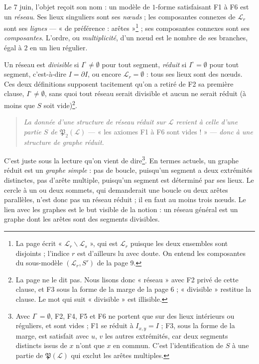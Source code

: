 \documentclass[11pt,a4paper]{article}
\begin{document}
Le 7 juin, l'objet reçoit son nom : un modèle de $1$-forme satisfaisant F1 à
F6 est un \emph{réseau}. Ses lieux singuliers sont ses \emph{nœuds} ; les
composantes connexes de $\mathcal{L}_{r}$ sont ses \emph{lignes} --- « de
préférence : arêtes »\footnote{La page écrit « $\mathcal{L}_{r} \smallsetminus
\mathcal{L}_{s}$ », qui est $\mathcal{L}_{r}$ puisque les deux ensembles sont
disjoints ; l'indice $r$ est d'ailleurs lu avec doute. On entend les
composantes du sous-modèle $(\mathcal{L}_{r}, S')$ de la page 9.} ; ses
composantes connexes sont ses \emph{composantes}. L'ordre, ou
\emph{multiplicité}, d'un nœud est le nombre de ses branches, égal à $2$ en
un lieu régulier.

Un réseau est \emph{divisible} si $I^{\circ} \neq \emptyset$ pour tout
segment, \emph{réduit} si $I^{\circ} = \emptyset$ pour tout segment,
c'est-à-dire $I = \partial I$, ou encore $\mathcal{L}_{r} = \emptyset$ : tous
ses lieux sont des nœuds. Ces deux définitions supposent tacitement qu'on a
retiré de F2 sa première clause, $I^{\circ} \neq \emptyset$, sans quoi tout
réseau serait divisible et aucun ne serait réduit (à moins que $S$ soit
vide)\footnote{La page ne le dit pas. Nous lisons donc « réseau » avec F2
privé de cette clause, et F3 sous la forme de la marge de la page 6 ;
« divisible » restitue la clause. Le mot qui suit « divisible » est
illisible.}.

\begin{quote}
\emph{La donnée d'une structure de réseau réduit sur $\mathcal{L}$ revient à
celle d'une partie $S$ de $\mathfrak{P}_{2}(\mathcal{L})$} --- « les axiomes
F1 à F6 sont vides ! » --- \emph{donc à une structure de graphe réduit.}
\end{quote}

C'est juste sous la lecture qu'on vient de dire\footnote{Avec $I^{\circ} =
\emptyset$, F2, F4, F5 et F6 ne portent que sur des lieux intérieurs ou
réguliers, et sont vides ; F1 se réduit à $I_{x,y} = I$ ; F3, sous la forme de
la marge, est satisfait avec $u$, $v$ les autres extrémités, car deux
segments distincts issus de $x$ n'ont que $x$ en commun. C'est l'identification
de $S$ à une partie de $\mathfrak{P}(\mathcal{L})$ qui exclut les arêtes
multiples.}. En termes actuels, un graphe réduit est un \emph{graphe simple}
: pas de boucle, puisqu'un segment a deux extrémités distinctes, pas d'arête
multiple, puisqu'un segment est déterminé par ses lieux. Le cercle à un ou
deux sommets, qui demanderait une boucle ou deux arêtes parallèles, n'est donc
pas un réseau réduit ; il en faut au moins trois nœuds. Le lien avec les
graphes est le but visible de la notion : un réseau général est un graphe
dont les arêtes sont des segments divisibles.
\end{document}
